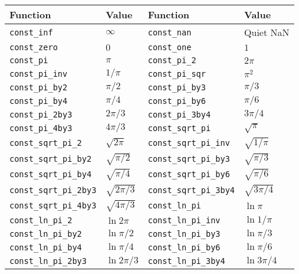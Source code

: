 \begin{table}
  \begin{tabularx}{\textwidth}{p{2in}Lp{2in}L}
    \toprule
    Function & Value & Function & Value \\
    \midrule
    \verb|const_inf|          & $\infty$        &
    \verb|const_nan|          & Quiet NaN       \\
    \verb|const_zero|         & $0$             &
    \verb|const_one|          & $1$             \\
    \verb|const_pi|           & $\pi$           &
    \verb|const_pi_2|         & $2\pi$          \\
    \verb|const_pi_inv|       & $1/\pi$         &
    \verb|const_pi_sqr|       & $\pi^2$         \\
    \verb|const_pi_by2|       & $\pi/2$         &
    \verb|const_pi_by3|       & $\pi/3$         \\
    \verb|const_pi_by4|       & $\pi/4$         &
    \verb|const_pi_by6|       & $\pi/6$         \\
    \verb|const_pi_2by3|      & $2\pi/3$        &
    \verb|const_pi_3by4|      & $3\pi/4$        \\
    \verb|const_pi_4by3|      & $4\pi/3$        &
    \verb|const_sqrt_pi|      & $\sqrt{\pi}$    \\
    \verb|const_sqrt_pi_2|    & $\sqrt{2\pi}$   &
    \verb|const_sqrt_pi_inv|  & $\sqrt{1/\pi}$  \\
    \verb|const_sqrt_pi_by2|  & $\sqrt{\pi/2}$  &
    \verb|const_sqrt_pi_by3|  & $\sqrt{\pi/3}$  \\
    \verb|const_sqrt_pi_by4|  & $\sqrt{\pi/4}$  &
    \verb|const_sqrt_pi_by6|  & $\sqrt{\pi/6}$  \\
    \verb|const_sqrt_pi_2by3| & $\sqrt{2\pi/3}$ &
    \verb|const_sqrt_pi_3by4| & $\sqrt{3\pi/4}$ \\
    \verb|const_sqrt_pi_4by3| & $\sqrt{4\pi/3}$ &
    \verb|const_ln_pi|        & $\ln{\pi}$      \\
    \verb|const_ln_pi_2|      & $\ln{2\pi}$     &
    \verb|const_ln_pi_inv|    & $\ln{1/\pi}$    \\
    \verb|const_ln_pi_by2|    & $\ln{\pi/2}$    &
    \verb|const_ln_pi_by3|    & $\ln{\pi/3}$    \\
    \verb|const_ln_pi_by4|    & $\ln{\pi/4}$    &
    \verb|const_ln_pi_by6|    & $\ln{\pi/6}$    \\
    \verb|const_ln_pi_2by3|   & $\ln{2\pi/3}$   &
    \verb|const_ln_pi_3by4|   & $\ln{3\pi/4}$   \\

\end{tabularx}
\end{table}
